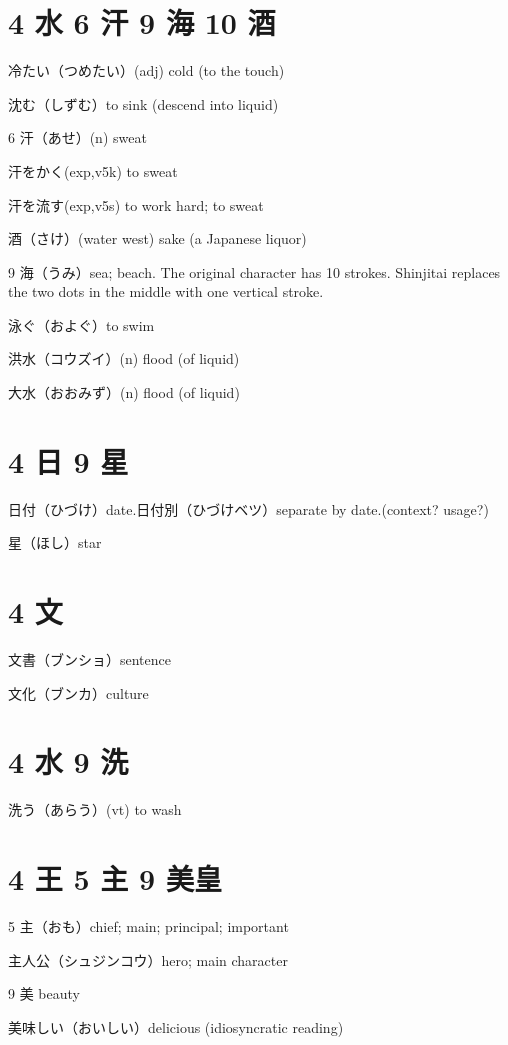 \section{4 水 6 汗 9 海 10 酒}

冷たい（つめたい）(adj) cold (to the touch)

沈む（しずむ）to sink (descend into liquid)

6 汗（あせ）(n) sweat

汗をかく(exp,v5k) to sweat

汗を流す(exp,v5s) to work hard; to sweat

酒（さけ）(water west) sake (a Japanese liquor)

9 海（うみ）sea; beach.
The original character has 10 strokes.
Shinjitai replaces the two dots in the middle
with one vertical stroke.

泳ぐ（およぐ）to swim

洪水（コウズイ）(n) flood (of liquid)

大水（おおみず）(n) flood (of liquid)

\section{4 日 9 星}

日付（ひづけ）date.日付別（ひづけベツ）separate by date.(context? usage?)

星（ほし）star

\section{4 文}

文書（ブンショ）sentence

文化（ブンカ）culture

\section{4 水 9 洗}

洗う（あらう）(vt) to wash

\section{4 王 5 主 9 美皇}

5 主（おも）chief; main; principal; important

主人公（シュジンコウ）hero; main character

9 美 beauty

美味しい（おいしい）delicious (idiosyncratic reading)

